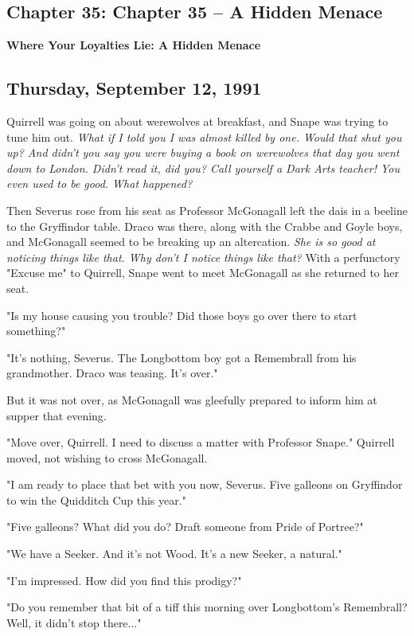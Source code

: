 \documentclass[a4paper,11pt]{article}
\begin{document}
\subsection{Chapter 35: Chapter 35 – A Hidden Menace}

\textbf{Where Your Loyalties Lie: A Hidden Menace}

\subsection{Thursday, September 12, 1991}

Quirrell was going on about werewolves at breakfast, and Snape was trying to tune him out. \emph{What if I told you I was almost killed by one. Would that shut you up? And didn't you say you were buying a book on werewolves that day you went down to London. Didn't read it, did you? Call yourself a Dark Arts teacher! You even used to be good. What happened?}

Then Severus rose from his seat as Professor McGonagall left the dais in a beeline to the Gryffindor table. Draco was there, along with the Crabbe and Goyle boys, and McGonagall seemed to be breaking up an altercation. \emph{She is so good at noticing things like that. Why don't I notice things like that?} With a perfunctory "Excuse me" to Quirrell, Snape went to meet McGonagall as she returned to her seat.

"Is my house causing you trouble? Did those boys go over there to start something?"

"It's nothing, Severus. The Longbottom boy got a Remembrall from his grandmother. Draco was teasing. It's over."

But it was not over, as McGonagall was gleefully prepared to inform him at supper that evening.

"Move over, Quirrell. I need to discuss a matter with Professor Snape." Quirrell moved, not wishing to cross McGonagall.

"I am ready to place that bet with you now, Severus. Five galleons on Gryffindor to win the Quidditch Cup this year."

"Five galleons? What did you do? Draft someone from Pride of Portree?"

"We have a Seeker. And it's not Wood. It's a new Seeker, a natural."

"I'm impressed. How did you find this prodigy?"

"Do you remember that bit of a tiff this morning over Longbottom's Remembrall? Well, it didn't stop there..."
\end{document}
